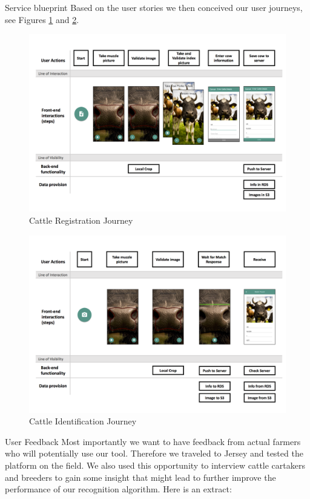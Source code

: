 
\begin{subsection}{Service blueprint}
  Based on the user stories we then conceived our user journeys, see Figures \ref{fig:register-cattle-journey} and \ref{fig:identify-cattle-journey}.
  \begin{figure}
    \includegraphics[width=\textwidth]{images/register-cattle-journey.png}
    \caption{Cattle Registration Journey}
    \label{fig:register-cattle-journey}
  \end{figure}
  \begin{figure}
    \includegraphics[width=\textwidth]{images/identify-cattle-journey.png}
    \caption{Cattle Identification Journey}
    \label{fig:identify-cattle-journey}
  \end{figure}
\end{subsection}


\begin{subsection}{User Feedback}
  Most importantly we want to have feedback from actual farmers who will potentially use our tool. Therefore we traveled to Jersey and tested the platform on the field. We also used this opportunity to interview cattle cartakers and breeders to gain some insight that might lead to further improve the performance of our recognition algorithm. Here is an extract:
\end{subsection}

